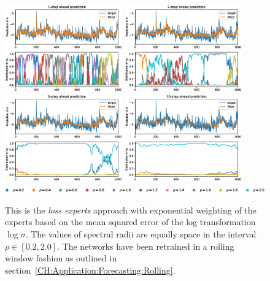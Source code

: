 \begin{figure}
    \begin{center}
        \includegraphics[width=0.45\textwidth]{Plots/Prediction/Experts_logMSE_rolling_1step.eps}
        \includegraphics[width=0.45\textwidth]{Plots/Prediction/Experts_logMSE_rolling_2step.eps} \\
        \includegraphics[width=0.45\textwidth]{Plots/Prediction/Experts_logMSE_rolling_5step.eps}
        \includegraphics[width=0.45\textwidth]{Plots/Prediction/Experts_logMSE_rolling_10step.eps} \\
        \includegraphics[width=1.0\textwidth]{Plots/Prediction/legend_experts.eps}
        \label{FIG:ExpertsLogMSERolling}
    \end{center}
    \caption{This is the \textit{loss experts} approach with exponential weighting of the experts based on the mean squared error of the log transformation $\log{\sigma}$. The values of spectral radii are equally space in the interval $\rho \in [0.2, 2.0]$. The networks have been retrained in a rolling window fashion as outlined in section \ref{CH:Application:Forecasting:Rolling}.}
\end{figure}

